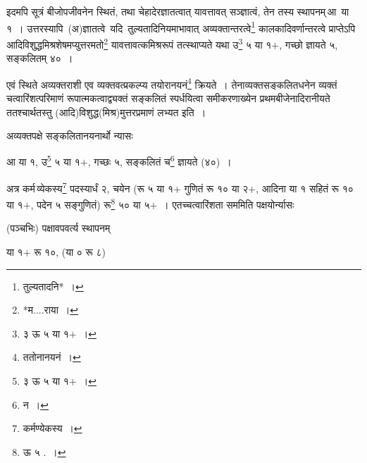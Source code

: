 \documentclass[10pt, openany]{book}
\begin{document}
{{{{{{{{इदमपि सूत्रं बीजोपजीवनेन स्थितं, तथा
चेहादेरज्ञातत्वात् यावत्तावत् सञ्ज्ञात्वं, तेन तस्य}
{स्थापनम्\textendash \,आ \,या \,१~। उत्तरस्यापि \,(अ)ज्ञातत्वे \,यदि \,तुल्यतादिनियमाभावात् अव्यक्तान्तरत्वे\renewcommand{\thefootnote}{५}\footnote{तुल्यतादनि*~।}}
{कालकादिवर्णान्तरत्वे प्राप्तेऽपि आदिविशुद्धमिश्रशेषमप्युत्तरमतो\renewcommand{\thefootnote}{६}\footnote{*म....राया~।} 
यावत्तावत्कमिश्ररूपं}
{तत्स्थाप्यते यथा उ\renewcommand{\thefootnote}{७}\footnote{३ ऊ ५ या १$+$~।}  ५ या १$+$, गच्छो ज्ञायते ५, सङ्कलितम् ४०~।}
\vspace{3mm}

{एवं स्थिते अव्यक्तराशी एव व्यक्तवत्प्रकल्प्य तयोरानयनं\renewcommand{\thefootnote}{८}\footnote{ततोनानयनं~।}  क्रियते~। 
तेनाव्यक्तसङ्कलितधनेन व्यक्तं चत्वारिंशत्परिमाणं रूपात्मकत्वाद्व्यक्तं सङ्कलितं
स्पर्धयित्वा समीकरणाख्येन प्रथमबीजेनादिरानीयते ततश्चार्थतस्तु
(आदि)विशुद्ध(मिश्र)मुत्तरप्रमाणं लभ्यत इति~।}
\vspace{3mm}

{अव्यक्तपक्षे सङ्कलितानयनार्थो न्यासः\textemdash}
\vspace{2mm}

\hspace{10mm} {आ या १, उ\renewcommand{\thefootnote}{९}\footnote{३ ऊ ५ या १$+$~।} ५ या १$+$, गच्छः ५, सङ्कलितं च\renewcommand{\thefootnote}{१०}\footnote{न~।}  ज्ञायते (४०)~।}
\vspace{3mm}

{अत्र कर्म\textendash \,व्येकस्य\renewcommand{\thefootnote}{११}\footnote{कर्मण्येकस्य~।}  पदस्यार्धं २, चयेन (रू ५ या १$+$ गुणितं रू १०
या २$+$, आदिना या १ सहितं रू १० या १$+$, पदेन ५ सङ्गुणितं) रू\renewcommand{\thefootnote}{१२}\footnote{ऊ ५ .~।}  ५० या ५$+$~। 
एतच्चत्वारिंशता सममिति पक्षयोर्न्यासः\textendash}
\vspace{2mm}


\newpage

(पञ्चभिः) पक्षावपवर्त्य स्थापनम्\textendash 
\vspace{2mm}

\hspace{2cm}या १$+$ रू १०, (या ० रू ८) 
\vspace{3mm}


\begin{quote}
    

\end{quote}}}}}}}}
\end{document}
